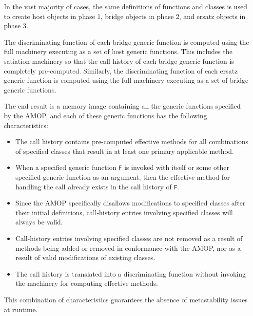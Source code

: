 In the vast majority of cases, the same definitions of functions and
classes is used to create host objects in phase 1, bridge objects in
phase 2, and ersatz objects in phase 3. 

The discriminating function of each bridge generic function is
computed using the full machinery executing as a set of host generic
functions.  This includes the satiation machinery so that the call
history of each bridge generic function is completely pre-computed.
Similarly, the discriminating function of each ersatz generic function
is computed using the full machinery executing as a set of bridge
generic functions.  

The end result is a memory image containing all the generic functions
specified by the AMOP, and each of these generic functions has the following
characteristics:

\begin{itemize}
\item The call history contains pre-computed effective methods for all
  combinations of specified classes that result in at least one primary
  applicable method.
\item When a specified generic function \texttt{F} is invoked with
  itself or some other specified generic function as an argument, then
  the effective method for handling the call already exists in the
  call history of \texttt{F}. 
\item Since the AMOP specifically disallows modifications to specified
  classes after their initial definitions, call-history entries
  involving specified classes will always be valid.
\item Call-history entries involving specified classes are not removed
  as a result of methods being added or removed in conformance with
  the AMOP, nor as a result of valid modifications of existing
  classes. 
\item The call history is translated into a discriminating function
  without invoking the machinery for computing effective methods. 
\end{itemize}

This combination of characteristics guarantees the absence of
metastability issues at runtime.

